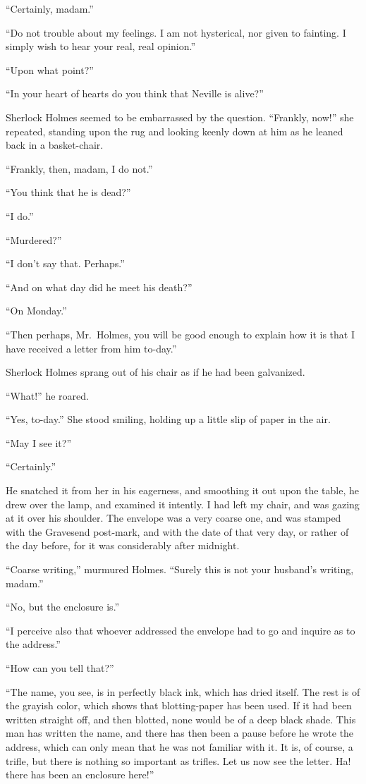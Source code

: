 “Certainly, madam.”

“Do not trouble about my feelings. I am not hysterical,
nor given to fainting. I simply wish to hear your real, real
opinion.”

“Upon what point?”

“In your heart of hearts do you think that Neville is alive?”

Sherlock Holmes seemed to be embarrassed by the question.
“Frankly, now!” she repeated, standing upon the rug
and looking keenly down at him as he leaned back in a
basket-chair.

“Frankly, then, madam, I do not.”

“You think that he is dead?”

“I do.”

“Murdered?”

“I don’t say that. Perhaps.”

“And on what day did he meet his death?”

“On Monday.”

“Then perhaps, Mr.~Holmes, you will be good enough
to explain how it is that I have received a letter from him
to-day.”

Sherlock Holmes sprang out of his chair as if he had been
galvanized.

“What!” he roared.

“Yes, to-day.” She stood smiling, holding up a little slip
of paper in the air.

“May I see it?”

“Certainly.”

He snatched it from her in his eagerness, and smoothing it
out upon the table, he drew over the lamp, and examined it
intently. I had left my chair, and was gazing at it over his
shoulder. The envelope was a very coarse one, and was
stamped with the Gravesend post-mark, and with the date of
that very day, or rather of the day before, for it was considerably
after midnight.

“Coarse writing,” murmured Holmes. “Surely this is not
your husband’s writing, madam.”

“No, but the enclosure is.”

“I perceive also that whoever addressed the envelope had
to go and inquire as to the address.”

“How can you tell that?”

“The name, you see, is in perfectly black ink, which has
dried itself. The rest is of the grayish color, which shows that
blotting-paper has been used. If it had been written straight
off, and then blotted, none would be of a deep black shade.
This man has written the name, and there has then been a
pause before he wrote the address, which can only mean that
he was not familiar with it. It is, of course, a trifle, but there
is nothing so important as trifles. Let us now see the letter.
Ha! there has been an enclosure here!”

